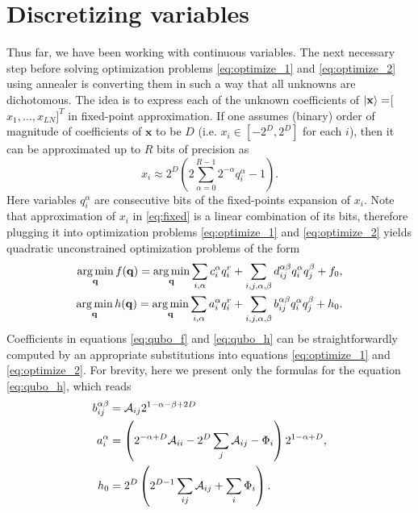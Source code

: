 \section{Discretizing variables}
Thus far, we have been working with continuous variables. The next necessary step before solving optimization problems \eqref{eq:optimize_1} and \eqref{eq:optimize_2} using annealer is converting them in such a way that all unknowns are dichotomous. The idea is to express each of the unknown coefficients of $\ket{\mathbf{x}} = $[$x_1, \ldots, x_{LN}]^T$ in  fixed-point approximation. If one  assumes (binary) order of magnitude of coefficients of $\mathbf x$ to be $D$ (i.e. $x_i \in [-2^D, 2^D]$ for each $i$), then it can be approximated up to $R$ bits of precision as
	\begin{equation}
		\label{eq:fixed}
		x_i \approx 2^D \left(2 \sum_{\alpha=0}^{R-1}2^{-\alpha}q_i^{\alpha} -1\right).
	\end{equation}
	Here variables $q_i^\alpha$ are consecutive bits of the fixed-points expansion of $x_i$. Note that approximation of $x_i$ in \eqref{eq:fixed} is a linear combination of its bits, therefore plugging it into optimization problems \eqref{eq:optimize_1} and \eqref{eq:optimize_2} yields
	quadratic unconstrained optimization problems of the form
	\begin{align}
		\label{eq:qubo_f}
		\operatorname*{arg\,min}_{\mathbf{q}} f(\mathbf{q}) = \operatorname*{arg\,min}_{\mathbf{q}} \sum_{i,\alpha} c_i^{\alpha} q_i^r + \sum_{i,j,\alpha,\beta} d_{ij}^{\alpha\beta} q_i^{\alpha} q_j^{\beta} + f_0, \\
		\label{eq:qubo_h}
		\operatorname*{arg\,min}_{\mathbf{q}} h(\mathbf{q}) = \operatorname*{arg\,min}_{\mathbf{q}} \sum_{i,\alpha} a_i^{\alpha} q_i^r + \sum_{i,j,\alpha,\beta} b_{ij}^{\alpha\beta} q_i^{\alpha} q_j^{\beta} + h_0.
	\end{align}
	Coefficients in equations \eqref{eq:qubo_f} and \eqref{eq:qubo_h} can be straightforwardly computed by an appropriate substitutions into equations \eqref{eq:optimize_1} and \eqref{eq:optimize_2}. For brevity, here we present only the formulas for the equation \eqref{eq:qubo_h}, which reads
	\begin{eqnarray}
		\begin{split}
			b_{ij}^{\alpha\beta} &= \mathcal{A}_{ij} 2^{1-\alpha-\beta+2D} \\
			a_i^\alpha &= \left( 2^{-\alpha+D}\mathcal{A}_{ii} - 2^D\sum_{j}\mathcal{A}_{ij}- \Phi_i\right)2^{1-\alpha+D},
			\\
			h_0 &= 2^D\left( 2^{D-1}\sum_{ij}\mathcal{A}_{ij}+\sum_i \Phi_i\right).
		\end{split}
		\label{eq:coeff}
	\end{eqnarray}

